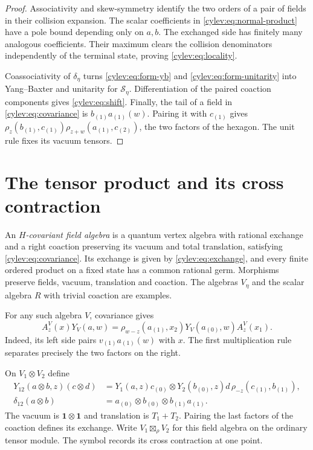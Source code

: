 \begin{proof}
Associativity and skew-symmetry identify the two orders of a pair
of fields in their collision expansion.
The scalar coefficients in \eqref{cylev:eq:normal-product} have a
pole bound depending only on $a,b$.
The exchanged side has finitely many analogous coefficients.
Their maximum clears the collision denominators independently of
the terminal state, proving \eqref{cylev:eq:locality}.

Coassociativity of $\delta_\eta$ turns
\eqref{cylev:eq:form-yb} and \eqref{cylev:eq:form-unitarity} into
Yang--Baxter and unitarity for $\mathcal S_\eta$.
Differentiation of the paired coaction components gives
\eqref{cylev:eq:shift}.
Finally, the tail of a field in \eqref{cylev:eq:covariance} is
$b_{(1)}a_{(1)}(w)$.
Pairing it with $c_{(1)}$ gives
$\rho_z(b_{(1)},c_{(1)})\rho_{z+w}(a_{(1)},c_{(2)})$,
the two factors of the hexagon.
The unit rule fixes its vacuum tensors.
\end{proof}

\section{The tensor product and its cross contraction}

An \emph{$H$-covariant field algebra} is a quantum vertex algebra
with rational exchange and a right coaction preserving its vacuum
and total translation, satisfying \eqref{cylev:eq:covariance}.
Its exchange is given by \eqref{cylev:eq:exchange}, and every finite
ordered product on a fixed state has a common rational germ.
Morphisms preserve fields, vacuum, translation and coaction.
The algebras $V_\eta$ and the scalar algebra $R$ with trivial coaction
are examples.

For any such algebra $V$, covariance gives
\begin{equation}\label{cylev:eq:annihilation-field}
 A_z^V(x)Y_V(a,w)
       =\rho_{w-z}(a_{(1)},x_2)Y_V(a_{(0)},w)A_z^V(x_1).
\end{equation}
Indeed, its left side pairs $v_{(1)}a_{(1)}(w)$ with $x$.
The first multiplication rule separates precisely the two factors
on the right.

On $V_1\otimes V_2$ define
\begin{align}
 Y_{12}(a\otimes b,z)(c\otimes d)
 &=Y_1(a,z)c_{(0)}\otimes Y_2(b_{(0)},z)d\,
        \rho_{-z}(c_{(1)},b_{(1)}),\label{cylev:eq:tensor-field}\\
 \delta_{12}(a\otimes b)
 &=a_{(0)}\otimes b_{(0)}\otimes b_{(1)}a_{(1)}.
       \label{cylev:eq:tensor-coaction}
\end{align}
The vacuum is $\mathbf1\otimes\mathbf1$ and translation is $T_1+T_2$.
Pairing the last factors of the coaction defines its exchange.
Write $V_1\boxtimes_\rho V_2$ for this field algebra on the ordinary
tensor module. The symbol records its cross contraction at one point.

